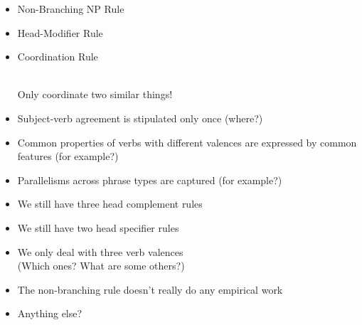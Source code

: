 \documentclass[a4paper,landscape,headrule,footrule]{foils}
\begin{document}
\begin{itemize}
\item Non-Branching NP Rule


\item Head-Modifier Rule

\newpage
\item Coordination Rule

\avm{[ [ head \1 ] $\rightarrow$\ \ \ %
[ head \1 ]+\ [\type*{word}\\
 head & \type{conj} ]\  [ head \1 ]]}
\\[4ex]
Only coordinate two similar things!
\end{itemize}

\begin{itemize}
\item Subject-verb agreement is stipulated only
once (where?)
\item Common properties of verbs with different
valences are expressed by common features
(for example?)
\item Parallelisms across phrase types are captured
(for example?)
\end{itemize}

\begin{itemize}
\item We still have three head complement rules
\item We still have two head specifier rules
\item We only deal with three verb valences
\\ (Which ones? What are some others?)
\item The non-branching rule doesn’t really do any
empirical work
\item Anything else?
\end{itemize}
\end{document}
